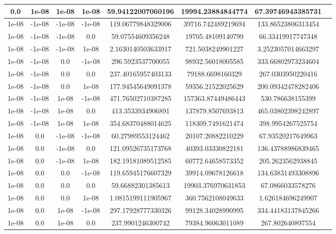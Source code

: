 \documentclass[a4paper]{article}
\begin{document}
\begin{center}
\begin{longtable}{@{}c|@{}c|@{}c|@{}c|@{}c|@{}c|@{}cX@{}}
        0.0 &1e-08 & 1e-08 & 1e-08 & 59.94122007060196 & 19994.23884844774 & 67.39746943385731\\ \hline
        1e-08 & -1e-08 & -1e-08 & -1e-08 & 119.06779848329006 & 39716.742489219694 & 133.86523806313454\\ \hline
        1e-08 & -1e-08 & -1e-08 & 0.0 & 59.07554609356248 & 19705.48109140799 & 66.33419917747348\\ \hline
        1e-08 & -1e-08 & -1e-08 & 1e-08 & 2.1630140503633917 & 721.5038249901227 & 3.2523057014663297\\ \hline
        1e-08 & -1e-08 & 0.0 &-1e-08 & 296.5923537700055 & 98932.56018005585 & 333.66802973234604\\ \hline
        1e-08 & -1e-08 & 0.0 &0.0 & 237.40165957403133 & 79188.6698160329 & 267.0303950220416\\ \hline
        1e-08 & -1e-08 & 0.0 &1e-08 & 177.94545649091378 & 59356.21522025629 & 200.09342478282406\\ \hline
        1e-08 & -1e-08 & 1e-08 & -1e-08 & 471.76502710387285 & 157363.87449486443 & 530.786638155399\\ \hline
        1e-08 & -1e-08 & 1e-08 & 0.0 & 413.3533934906891 & 137879.8507693813 & 465.03802398242897\\ \hline
        1e-08 & -1e-08 & 1e-08 & 1e-08 & 354.68370488014625 & 118309.7491621474 & 398.9954267525754\\ \hline
        1e-08 & 0.0 &-1e-08 & -1e-08 & 60.27989553124462 & 20107.20882210229 & 67.93520217649963\\ \hline
        1e-08 & 0.0 &-1e-08 & 0.0 & 121.09526735173768 & 40393.03330822181 & 136.43788986839465\\ \hline
        1e-08 & 0.0 &-1e-08 & 1e-08 & 182.19181089512585 & 60772.64658573352 & 205.2623562938845\\ \hline
        1e-08 & 0.0 &0.0 &-1e-08 & 119.65945176607329 & 39914.09678126618 & 134.63831493308896\\ \hline
        1e-08 & 0.0 &0.0 &0.0 & 59.66882301385613 & 19903.376970631853 & 67.0866033578276\\ \hline
        1e-08 & 0.0 &0.0 &1e-08 & 1.0815199111905967 & 360.7562108049633 & 1.626184696249907\\ \hline
        1e-08 & 0.0 &1e-08 & -1e-08 & 297.17928777330326 & 99128.34028990995 & 334.44183137845266\\ \hline
        1e-08 & 0.0 &1e-08 & 0.0 & 237.9901246300742 & 79384.96063011089 & 267.802640897554\\ \hline

\end{longtable}
\end{center}
\end{document}
